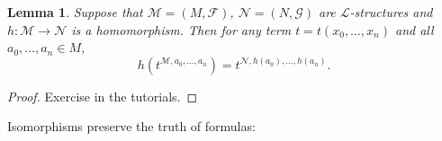 \documentclass[a4paper, 11pt]{amsart}
\newtheorem{lemma}[lemma]{Lemma}
\theoremstyle{remark}
\newcommand{\cF}{\mathcal F}
\newcommand{\cG}{\mathcal G}
\newcommand{\cL}{\mathcal L}
\newcommand{\cM}{\mathcal M}
\newcommand{\cN}{\mathcal N}
\begin{document}
\begin{lemma} 
\label{homomorphisms preserve terms} 
Suppose that $\cM=(M,\cF)$, $\cN=(N,\cG)$ are $\cL$-structures and $h\colon \cM\rightarrow \cN$ is a homomorphism. 
Then for any term $t=t(x_0,\dots,x_n)$ and all $a_0,\dots,a_n\in M$, 
$$ h(t^{\cM,a_0,\dots,a_n})= t^{\cN,h(a_0),\dots,h(a_n)}.$$ 
\end{lemma} 
\begin{proof} 
Exercise in the tutorials. 
\end{proof} 
\iffalse 
\begin{proof} 
By induction on terms. 
For any constant symbol $c\in \cL$, we have $h(c^\cM)=c^\cN$, since $h$ is a homomorphism. 
For any variable $x$ and $a\in M$, $h(x^{\cM,a})=h(a)=c^{\cN,h(a)}$. 
Suppose that $t=f(t_0,\dots,t_k)$ and assume for ease of notation that $x_0,\dots,x_n$ occur freely in $t_i$ for all $i\leq n$. 
Using the inductive hypothesis, we have $h(f(t_0,\dots,t_k)^{\cM,a_0,\dots,a_n})=f^\cN (h(t_0^{\cM,a_0,\dots,a_n},\dots,t_0^{\cM,a_0,\dots,a_n})= f^\cN (t_0^{\cN,h(a_0),\dots,h(a_n)},\dots,t_k^{\cN,h(a_0),\dots,h(a_n)})= f (t_0,\dots,t_k)^{\cN,h(a_0),\dots,h(a_n)}$. 
\end{proof} 
\fi 

Isomorphisms preserve the truth of formulas: 
\end{document}
